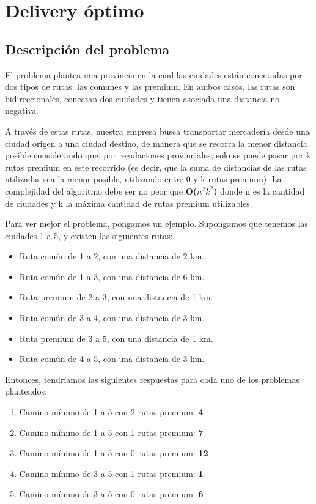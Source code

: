 \section{Delivery óptimo}

\subsection{Descripción del problema}
El problema plantea una provincia en la cual las ciudades están conectadas por dos tipos de rutas: las comunes y las premium. En ambos casos, las rutas son bidireccionales, conectan dos ciudades y tienen asociada una distancia no negativa.
\\
\par
A través de estas rutas, nuestra empresa busca transportar mercadería desde una ciudad origen a una ciudad destino, de manera que se recorra la menor distancia posible considerando que, por regulaciones provinciales, solo se puede pasar por k rutas premium en este recorrido (es decir, que la suma de distancias de las rutas utilizadas sea la menor posible, utilizando entre 0 y k rutas premium). La complejidad del algoritmo debe ser no peor que \textbf{O($n^2k^2$)} donde n es la cantidad de ciudades y k la máxima cantidad de rutas premium utilizables.
\\
\par
Para ver mejor el problema, pongamos un ejemplo. Supongamos que tenemos las ciudades 1 a 5, y existen las siguientes rutas:
\begin{itemize}
\item Ruta común de 1 a 2, con una distancia de 2 km.
\item Ruta común de 1 a 3, con una distancia de 6 km.
\item Ruta premium de 2 a 3, con una distancia de 1 km.
\item Ruta común de 3 a 4, con una distancia de 3 km.
\item Ruta premium de 3 a 5, con una distancia de 1 km.
\item Ruta común de 4 a 5, con una distancia de 3 km.
\end{itemize}
Entonces, tendríamos las siguientes respuestas para cada uno de los problemas planteados:
\begin{enumerate}
\item Camino mínimo de 1 a 5 con 2 rutas premium: \textbf{4}
\item Camino mínimo de 1 a 5 con 1 rutas premium: \textbf{7}
\item Camino mínimo de 1 a 5 con 0 rutas premium: \textbf{12}
\item Camino mínimo de 3 a 5 con 1 rutas premium: \textbf{1}
\item Camino mínimo de 3 a 5 con 0 rutas premium: \textbf{6}
\end{enumerate}
